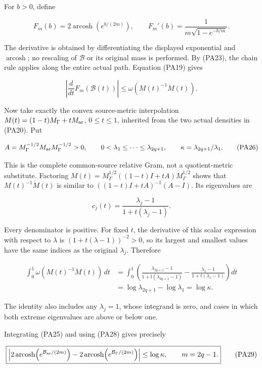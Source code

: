 For \(b>0\), define

\[
F_m(b)=2\operatorname{arcosh}(e^{b/(2m)}),
\qquad
F_m'(b)=\frac{1}{m\sqrt{1-e^{-b/m}}}.
\tag{PA24}
\]

The derivative is obtained by differentiating the displayed exponential and \(\operatorname{arcosh}\); no rescaling of \(\mathcal B\) or its original mass is performed. By (PA23), the chain rule applies along the entire actual path. Equation (PA19) gives

\[
\left|\frac{d}{dt}F_m(\mathcal B(t))\right|
\le\omega(M(t)^{-1}\dot M(t)).
\tag{PA25}
\]

Now take exactly the convex source-metric interpolation \(M(t)=(1-t)M_\Gamma+tM_{\rm ar}\), \(0\le t\le1\), inherited from the two actual densities in (PA20). Put

\[
A=M_\Gamma^{-1/2}M_{\rm ar}M_\Gamma^{-1/2}>0,
\qquad 0<\lambda_1\le\cdots\le\lambda_{2q+1},
\qquad \kappa=\lambda_{2q+1}/\lambda_1.
\tag{PA26}
\]

This is the complete common-source relative Gram, not a quotient-metric substitute. Factoring \(M(t)=M_\Gamma^{1/2}((1-t)I+tA)M_\Gamma^{1/2}\) shows that \(M(t)^{-1}\dot M(t)\) is similar to \(((1-t)I+tA)^{-1}(A-I)\). Its eigenvalues are

\[
c_j(t)=\frac{\lambda_j-1}{1+t(\lambda_j-1)}.
\tag{PA27}
\]

Every denominator is positive. For fixed \(t\), the derivative of this scalar expression with respect to \(\lambda\) is \((1+t(\lambda-1))^{-2}>0\), so its largest and smallest values have the same indices as the original \(\lambda_j\). Therefore

\[
\begin{aligned}
\int_0^1\omega(M(t)^{-1}\dot M(t))\,dt
&=\int_0^1\left(
\frac{\lambda_{2q+1}-1}{1+t(\lambda_{2q+1}-1)}
-\frac{\lambda_1-1}{1+t(\lambda_1-1)}\right)dt\\
&=\log\lambda_{2q+1}-\log\lambda_1
=\log\kappa.
\end{aligned}
\tag{PA28}
\]

The identity also includes any \(\lambda_j=1\), whose integrand is zero, and cases in which both extreme eigenvalues are above or below one.

Integrating (PA25) and using (PA28) gives precisely

\[
\boxed{
\left|
2\operatorname{arcosh}\!\left(e^{\mathcal B_{\rm ar}/(2m)}\right)
-2\operatorname{arcosh}\!\left(e^{\mathcal B_\Gamma/(2m)}\right)
\right|
\le\log\kappa,
\qquad m=2q-1.
}
\tag{PA29}
\]

